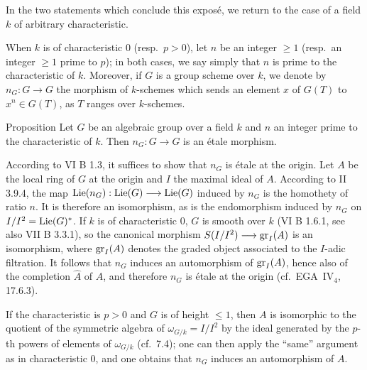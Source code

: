 In the two statements which conclude this expos\'e, we return to the case of a field $k$ of arbitrary characteristic.

When $k$ is of characteristic $0$ (resp.\ $p>0$), let $n$ be an integer $\geq1$ (resp.\ an integer $\geq1$ prime to $p$); in both cases, we say simply that $n$ is prime to the characteristic of $k$. Moreover, if $G$ is a group scheme over $k$, we denote by $n_G:G\to G$ the morphism of $k$-schemes which sends an element $x$ of $G(T)$ to $x^n\in G(T)$, as $T$ ranges over $k$-schemes.

\begin{enonce}{Proposition}{}\label{VIIA.8.4}
Let $G$ be an algebraic group over a field $k$ and $n$ an integer prime to the characteristic of $k$. Then $n_G:G\to G$ is an \textup{\'etale} morphism.
\end{enonce}
According to VI B 1.3, it suffices to show that $n_G$ is \'etale at the origin. Let $A$ be the local ring of $G$ at the origin and $I$ the maximal ideal of $A$. According to II 3.9.4, the map $\operatorname{Lie}(n_G):\operatorname{Lie}(G)\longrightarrow\operatorname{Lie}(G)$ induced by $n_G$ is the homothety of ratio $n$. It is therefore an isomorphism, as is the endomorphism induced by $n_G$ on $I/I^2=\operatorname{Lie}(G)^*$. If $k$ is of characteristic $0$, $G$ is smooth over $k$ (VI B 1.6.1, see also VII B 3.3.1), so the canonical morphism $S(I/I^2)\longrightarrow\operatorname{gr}_I(A)$ is an isomorphism, where $\operatorname{gr}_I(A)$ denotes the graded object associated to the $I$-adic filtration. It follows that $n_G$ induces an automorphism of $\operatorname{gr}_I(A)$, hence also of the completion $\widehat A$ of $A$, and therefore $n_G$ is \'etale at the origin (cf.\ EGA~IV$_4$, 17.6.3).

If the characteristic is $p>0$ and $G$ is of height $\leq1$, then $A$ is isomorphic to the quotient of the symmetric algebra of $\omega_{G/k}=I/I^2$ by the ideal generated by the $p$-th powers of elements of $\omega_{G/k}$ (cf.\ 7.4); one can then apply the ``same'' argument as in characteristic $0$, and one obtains that $n_G$ induces an automorphism of $A$.

